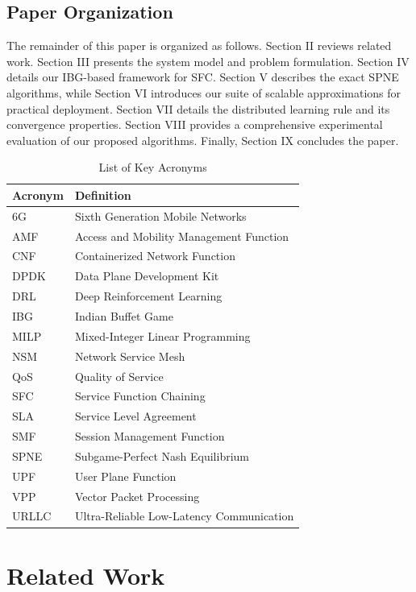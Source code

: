 \documentclass[journal]{IEEEtran}
\theoremstyle{plain}
\theoremstyle{definition}
\theoremstyle{remark}
\begin{document}
\subsection{Paper Organization}
\label{sec:intro_organization}

The remainder of this paper is organized as follows. Section II reviews related work. Section III presents the system model and problem formulation. Section IV details our IBG-based framework for SFC. Section V describes the exact SPNE algorithms, while Section VI introduces our suite of scalable approximations for practical deployment. Section VII details the distributed learning rule and its convergence properties. Section VIII provides a comprehensive experimental evaluation of our proposed algorithms. Finally, Section IX concludes the paper. 

\begin{table}[!t]
\centering
\caption{List of Key Acronyms}
\label{tab:acronyms}
\renewcommand{\arraystretch}{1.2}
\begin{tabular}{l l}
\toprule
\textbf{Acronym} & \textbf{Definition} \\
\midrule
6G & Sixth Generation Mobile Networks \\
AMF & Access and Mobility Management Function \\
CNF & Containerized Network Function \\
DPDK & Data Plane Development Kit \\
DRL & Deep Reinforcement Learning \\
IBG & Indian Buffet Game \\
MILP & Mixed-Integer Linear Programming \\
NSM & Network Service Mesh \\
QoS & Quality of Service \\
SFC & Service Function Chaining \\
SLA & Service Level Agreement \\
SMF & Session Management Function \\
SPNE & Subgame-Perfect Nash Equilibrium \\
UPF & User Plane Function \\
VPP & Vector Packet Processing \\
URLLC & Ultra-Reliable Low-Latency Communication \\
\bottomrule
\end{tabular}
\end{table}


\section{Related Work}
\label{sec:related_work}
\end{document}
